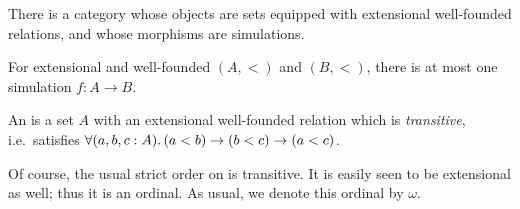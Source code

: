 \documentclass[hott-all.tex]{subfiles}
\begin{document}
% 
\begin{cor}
  There is a category whose objects are sets equipped with extensional well-founded relations, and whose morphisms are simulations.
\end{cor}
% 
% 
\begin{lem}
  For extensional and well-founded $(A,<)$ and $(B,<)$, there is at most one simulation $f:A\to B$.
\end{lem}
% 
% 
% 
\begin{defn}
  An 
  is a set $A$ with an extensional well-founded relation which is \emph{transitive}, i.e.\ satisfies $\fall{a,b,c:A}(a<b)\to (b<c) \to (a<c)$.
\end{defn}
% 
\begin{eg}
  Of course, the usual strict order on \nat is transitive.
  It is easily seen to be extensional as well; thus it is an ordinal.
  As usual, we denote this ordinal by $\omega$.
\end{eg}
% 
\end{document}
